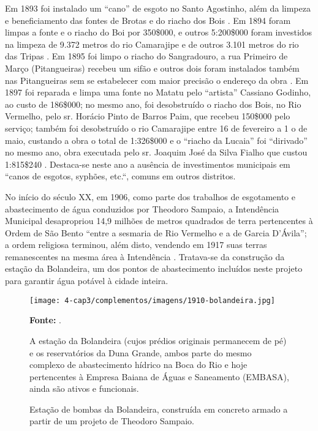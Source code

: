 Em 1893 foi instalado um ``cano'' de esgoto no Santo Agostinho, além da limpeza e beneficiamento das fontes de Brotas e do riacho dos Bois \cite[pp.~6-7]{salvador_relatorio_1893}. Em 1894 foram limpas a fonte e o riacho do Boi por 350\$000, e outros 5:200\$000 foram investidos na limpeza de 9.372 metros do rio Camarajipe e de outros 3.101 metros do rio das Tripas \cite[p.~156]{salvador_relatorio_1894}. Em 1895 foi limpo o riacho do Sangradouro, a rua Primeiro de Março (Pitangueiras) recebeu um sifão e outros dois foram instalados também nas Pitangueiras sem se estabelecer com maior precisão o endereço da obra \cite[pp.~20, 137-138]{salvador_relatorio_1895}. Em 1897 foi reparada e limpa uma fonte no Matatu pelo ``artista'' Cassiano Godinho, ao custo de 186\$000; no mesmo ano, foi desobstruído o riacho dos Bois, no Rio Vermelho, pelo sr. Horácio Pinto de Barros Paim, que recebeu 150\$000 pelo serviço; também foi desobstruído o rio Camarajipe entre 16 de fevereiro a 1 o de maio, custando a obra o total de 1:326\$000 e o ``riacho da Lucaia'' foi ``dirivado'' no mesmo ano, obra executada pelo sr. Joaquim José da Silva Fialho que custou 1:815\$240 \cite[p.~99-100]{salvador_relatorio_1897}. Destaca-se neste ano a ausência de investimentos municipais em ``canos de esgotos, syphões, etc.``, comuns em outros distritos.

No início do século XX, em 1906, como parte dos trabalhos de esgotamento e abastecimento de água conduzidos por Theodoro Sampaio, a Intendência Municipal desapropriou 14,9 milhões de metros quadrados de terra pertencentes à Ordem de São Bento ``entre a sesmaria de Rio Vermelho e a de Garcia D'Ávila''; a ordem religiosa terminou, além disto, vendendo em 1917 suas terras remanescentes na mesma área à Intendência \cite[p.~306]{VASCONCELOS2002}. Tratava-se da construção da estação da Bolandeira, um dos pontos de abastecimento incluídos neste projeto para garantir água potável à cidade inteira.

\begin{figure}[!htp]
\centering
\caption{Estação de bombas da Bolandeira, construída em concreto armado a partir de um projeto de Theodoro Sampaio.}
\texttt{[image: 4-cap3/complementos/imagens/1910-bolandeira.jpg]}{\par \footnotesize \textbf{Fonte:} . \par A estação da Bolandeira (cujos prédios originais permanecem de pé) e os reservatórios da Duna Grande, ambos parte do mesmo complexo de abastecimento hídrico na Boca do Rio e hoje pertencentes à Empresa Baiana de Águas e Saneamento (EMBASA), ainda são ativos e funcionais.}
\label{fig:bolandeira}
\end{figure}

